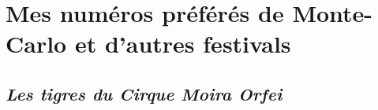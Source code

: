 \chapter{Mes numéros préférés de Monte-Carlo et d’autres festivals}

\section*{\textit{Les tigres du Cirque Moira Orfei}}
{}
